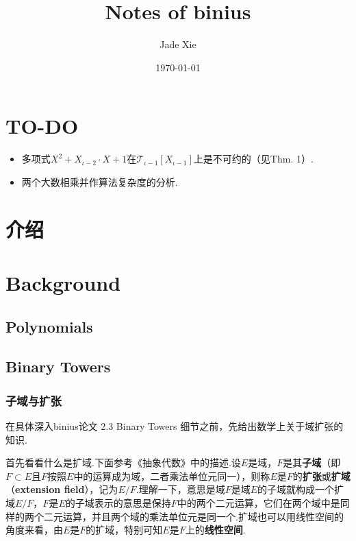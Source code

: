 \documentclass[10pt]{ctexart}
\title{Notes of binius}
\author{Jade Xie}
\date{\today}
\begin{document}
\maketitle
\tableofcontents
\section{TO-DO}
\begin{itemize}
    \item 多项式$X^2 + X_{\iota - 2} \cdot X + 1$在$\mathcal{T}_{\iota - 1}[X_{\iota - 1}]$上是不可约的（见\cite{iterated-quadratic}Thm. 1）.
    \item 两个大数相乘并作算法复杂度的分析.
\end{itemize}
\section{介绍}



\section{Background}
\subsection{Polynomials}

\subsection{Binary Towers}
\subsubsection{子域与扩张}
在具体深入binius论文\cite{binius} 2.3 Binary Towers 细节之前，先给出数学上关于域扩张的知识.

首先看看什么是扩域.下面参考《抽象代数》\cite{abstract-algerb}中的描述.设$E$是域，$F$是其\textbf{子域}（即$F \subset E$且$F$按照$E$中的运算成为域，二者乘法单位元同一），则称$E$是$F$的\textbf{扩张}或\textbf{扩域}（\textbf{extension field}），记为$E/F$.理解一下，意思是域$F$是域$E$的子域就构成一个扩域$E/F$，$F$是$E$的子域表示的意思是保持$F$中的两个二元运算，它们在两个域中是同样的两个二元运算，并且两个域的乘法单位元是同一个.扩域也可以用线性空间的角度来看，由$E$是$F$的扩域，特别可知$E$是$F$上的\textbf{线性空间}.
\end{document}
